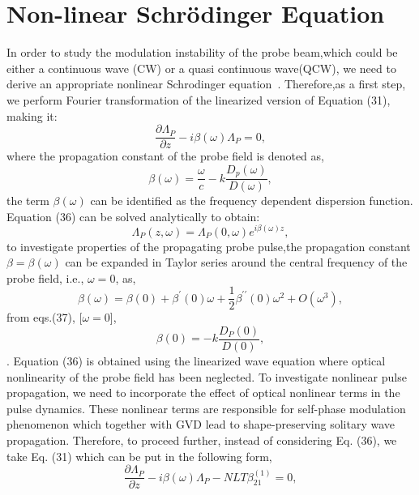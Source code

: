 \documentclass[12pt,a4paper]{article}
\begin{document}
\section{Non-linear Schr\"{o}dinger Equation}
In order to study the modulation instability of the probe beam,which could be either a continuous wave (CW) or a quasi continuous wave(QCW), we need to derive an appropriate nonlinear Schrodinger equation~\cite{Scully_Zubairy_1997}. Therefore,as a first step, we perform Fourier transformation of the linearized version of Equation (31), making it:
\begin{equation}
    \frac{\partial\Lambda_P}{\partial z}-i\beta(\omega)\Lambda_P=0,
\end{equation}
where the propagation constant of the probe field is denoted as,
\begin{equation}
    \beta(\omega)=\frac{\omega}{c}-k\frac{D_p(\omega)}{D(\omega)},
\end{equation}
the term \(\beta(\omega)\) can be identified as the frequency dependent dispersion function. Equation (36) can be solved analytically to obtain:
\begin{equation}
    \Lambda_P(z,\omega)=\Lambda_P(0,\omega)e^{i\beta(\omega)z},
\end{equation}
to investigate properties of the propagating probe pulse,the propagation constant \(\beta=\beta(\omega)\) can be expanded in Taylor series around the central frequency of the probe field, i.e., \(\omega=0\), as,
\begin{equation}
    \beta(\omega)=\beta(0)+\beta^\prime(0)\omega+\frac{1}{2}\beta^{\prime\prime}(0)\omega^2+O(\omega^3),
\end{equation}
from eqs.(37), [\(\omega=0\)],
\begin{equation}
    \beta(0)=-k\frac{D_P(0)}{D(0)},
\end{equation}.
Equation (36) is obtained using the linearized wave equation where optical nonlinearity of the probe field has been neglected. To investigate nonlinear pulse propagation, we need to incorporate the effect of optical nonlinear terms in the pulse dynamics. These nonlinear terms are responsible for self-phase modulation phenomenon which together with GVD lead to shape-preserving solitary wave propagation. Therefore, to proceed further, instead of considering Eq. (36), we take Eq. (31) which can be put in the following form,
\begin{equation}
    \frac{\partial\Lambda_P}{\partial z}-i\beta(\omega)\Lambda_P-NLT\beta^{(1)}_{21}=0,
\end{equation}
\end{document}
